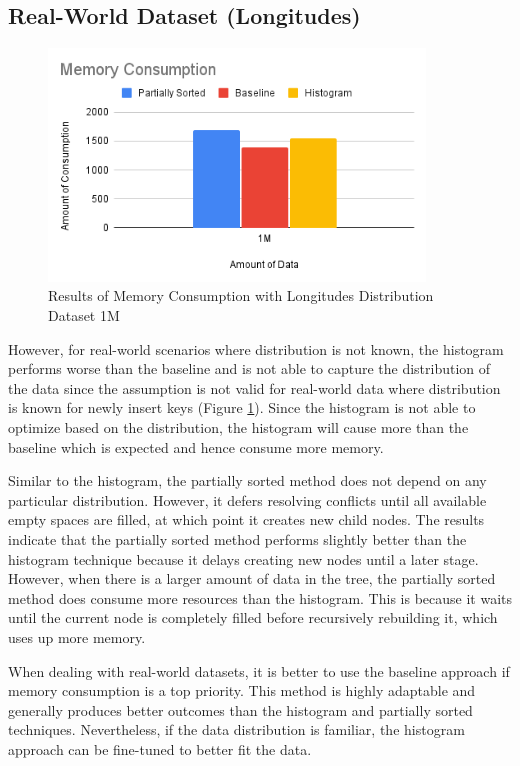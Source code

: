 \subsection{Real-World Dataset (Longitudes)}
\begin{figure}[H]
    \centering
    \includegraphics[width=100mm,scale=1]{Figures/MemoryLongitude.png}
    \caption{
     Results of Memory Consumption with Longitudes Distribution Dataset 1M
    }
    \label{fig:MemoryLongitude}
\end{figure}
However, for real-world scenarios where distribution is not known, the histogram performs worse than the baseline and is not able to capture the distribution of the data since the assumption is not valid for real-world data where distribution is known for newly insert keys (Figure \ref{fig:MemoryLongitude}). Since the histogram is not able to optimize based on the distribution, the histogram will cause more \conflict than the baseline which is expected and hence consume more memory. 

Similar to the histogram, the partially sorted method does not depend on any particular distribution. However, it defers resolving conflicts until all available empty spaces are filled, at which point it creates new child nodes. The results indicate that the partially sorted method performs slightly better than the histogram technique because it delays creating new nodes until a later stage. However, when there is a larger amount of data in the tree, the partially sorted method does consume more resources than the histogram. This is because it waits until the current node is completely filled before recursively rebuilding it, which uses up more memory.

When dealing with real-world datasets, it is better to use the baseline approach if memory consumption is a top priority. This method is highly adaptable and generally produces better outcomes than the histogram and partially sorted techniques. Nevertheless, if the data distribution is familiar, the histogram approach can be fine-tuned to better fit the data. 

